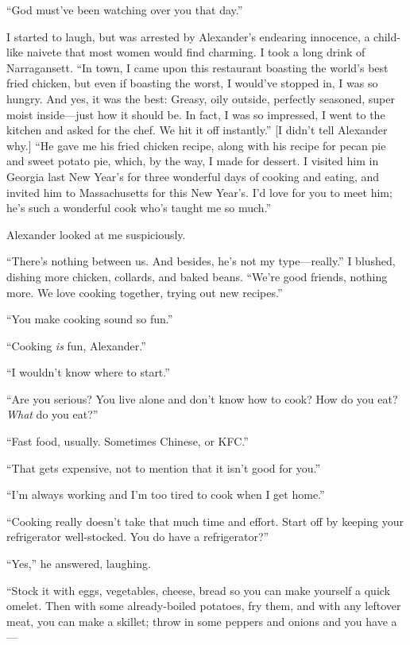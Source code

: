 ``God must've been watching over you that day.''

I started to laugh, but was arrested by Alexander's endearing innocence,
a child-like naivete that most women would find charming. I took a long
drink of Narragansett. ``In town, I came upon this restaurant boasting
the world's best fried chicken, but even if boasting the worst, I
would've stopped in, I was so hungry. And yes, it was the best: Greasy,
oily outside, perfectly seasoned, super moist inside---just how it
should be. In fact, I was so impressed, I went to the kitchen and asked
for the chef. We hit it off instantly.'' {[}I didn't tell Alexander
why.{]} ``He gave me his fried chicken recipe, along with his recipe for
pecan pie and sweet potato pie, which, by the way, I made for dessert. I
visited him in Georgia last New Year's for three wonderful days of
cooking and eating, and invited him to Massachusetts for this New
Year's. I'd love for you to meet him; he's such a wonderful cook who's
taught me so much.''

Alexander looked at me suspiciously.

``There's nothing between us. And besides, he's not my type---really.''
I blushed, dishing more chicken, collards, and baked beans. ``We're good
friends, nothing more. We love cooking together, trying out new
recipes.''

``You make cooking sound so fun.''

``Cooking \emph{is} fun, Alexander.''

``I wouldn't know where to start.''

``Are you serious? You live alone and don't know how to cook? How do you
eat? \emph{What} do you eat?''

``Fast food, usually. Sometimes Chinese, or KFC.''

``That gets expensive, not to mention that it isn't good for you.''

``I'm always working and I'm too tired to cook when I get home.''

``Cooking really doesn't take that much time and effort. Start off by
keeping your refrigerator well-stocked. You do have a refrigerator?''

``Yes,'' he answered, laughing.

``Stock it with eggs, vegetables, cheese, bread so you can make yourself
a quick omelet. Then with some already-boiled potatoes, fry them, and
with any leftover meat, you can make a skillet; throw in some peppers
and onions and you have a---


